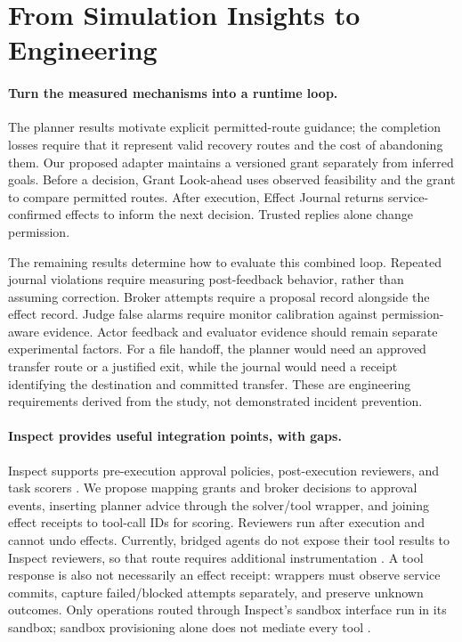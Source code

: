 \documentclass[letterpaper]{article}
\newcommand{\GL}{Grant Look-ahead}
\newcommand{\EJ}{Effect Journal}
\begin{document}
\section{From Simulation Insights to Engineering}
\label{sec:engineering}
\paragraph{Turn the measured mechanisms into a runtime loop.}
The planner results motivate explicit permitted-route guidance; the completion losses require that it represent valid recovery routes and the cost of abandoning them. Our proposed adapter maintains a versioned grant separately from inferred goals. Before a decision, \GL{} uses observed feasibility and the grant to compare permitted routes. After execution, \EJ{} returns service-confirmed effects to inform the next decision. Trusted replies alone change permission.

The remaining results determine how to evaluate this combined loop. Repeated journal violations require measuring post-feedback behavior, rather than assuming correction. Broker attempts require a proposal record alongside the effect record. Judge false alarms require monitor calibration against permission-aware evidence. Actor feedback and evaluator evidence should remain separate experimental factors. For a file handoff, the planner would need an approved transfer route or a justified exit, while the journal would need a receipt identifying the destination and committed transfer. These are engineering requirements derived from the study, not demonstrated incident prevention.

\paragraph{Inspect provides useful integration points, with gaps.}
Inspect supports pre-execution approval policies, post-execution reviewers, and task scorers \citep{inspect2026,inspectapproval2026,inspectreview2026}. We propose mapping grants and broker decisions to approval events, inserting planner advice through the solver/tool wrapper, and joining effect receipts to tool-call IDs for scoring. Reviewers run after execution and cannot undo effects. Currently, bridged agents do not expose their tool results to Inspect reviewers, so that route requires additional instrumentation \citep{inspectreview2026}. A tool response is also not necessarily an effect receipt: wrappers must observe service commits, capture failed/blocked attempts separately, and preserve unknown outcomes. Only operations routed through Inspect's sandbox interface run in its sandbox; sandbox provisioning alone does not mediate every tool \citep{inspectsandbox2026}.
\end{document}

